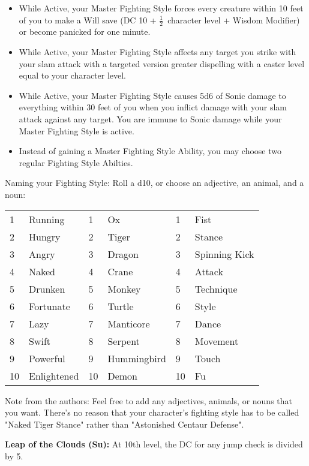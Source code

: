 \documentclass[10pt]{article}
\newcommand{\ability}[2]{\smallskip \noindent \textbf{#1} #2}
\newcommand{\half}[0]{\ensuremath{\frac{1}{2}}}
\begin{document}
\begin{itemize}
    \item While Active, your Master Fighting Style forces every creature within 10 feet of you to make a Will save (DC 10 + \half\  character level + Wisdom Modifier) or become panicked for one minute.
    \item While Active, your Master Fighting Style affects any target you strike with your slam attack with a targeted version greater dispelling with a caster level equal to your character level.
    \item While Active, your Master Fighting Style causes 5d6 of Sonic damage to everything within 30 feet of you when you inflict damage with your slam attack against any target. You are immune to Sonic damage while your Master Fighting Style is active.
    \item Instead of gaining a Master Fighting Style Ability, you may choose two regular Fighting Style Abilties.
\end{itemize}

\begin{floatingfigure}{3.6in}
\begin{small}
\noindent Naming your Fighting Style: Roll a d10, or choose an adjective, an animal, and a noun:\\

\noindent \begin{tabular}{|ll||ll||ll|} \hline
1&Running&1&Ox&1&Fist\\
2&Hungry&2&Tiger&2&Stance\\
3&Angry&3&Dragon&3&Spinning Kick\\
4&Naked&4&Crane&4&Attack\\
5&Drunken&5&Monkey&5&Technique\\
6&Fortunate&6&Turtle&6&Style\\
7&Lazy&7&Manticore&7&Dance\\
8&Swift&8&Serpent&8&Movement\\
9&Powerful&9&Hummingbird&9&Touch\\
10&Enlightened&10&Demon&10&Fu\\ \hline
\end{tabular}
Note from the authors: Feel free to add any adjectives, animals, or nouns that you want. There's no reason that your character's fighting style has to be called "Naked Tiger Stance" rather than "Astonished Centaur Defense".
\end{small}
\end{floatingfigure}


\ability{Leap of the Clouds (Su):}{At 10th level, the DC for any jump check is divided by 5.}
\end{document}
